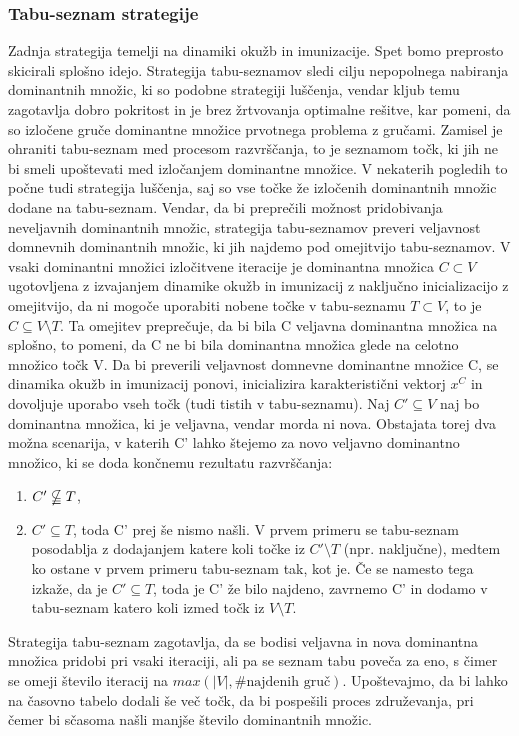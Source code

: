 \documentclass[a4paper]{article}
\begin{document}
\subsubsection{Tabu-seznam strategije} Zadnja strategija temelji na dinamiki okužb in imunizacije. Spet bomo preprosto skicirali splošno idejo. Strategija tabu-seznamov sledi cilju nepopolnega nabiranja dominantnih množic, ki so podobne strategiji luščenja, vendar kljub temu zagotavlja dobro pokritost in je brez žrtvovanja optimalne rešitve, kar pomeni, da so izločene gruče dominantne množice prvotnega problema z gručami. Zamisel je ohraniti tabu-seznam med procesom razvrščanja, to je seznamom točk, ki jih ne bi smeli upoštevati med izločanjem dominantne množice. V nekaterih pogledih to počne tudi strategija luščenja, saj so vse točke že izločenih dominantnih množic dodane na tabu-seznam. Vendar, da bi preprečili možnost pridobivanja neveljavnih dominantnih množic, strategija tabu-seznamov preveri veljavnost domnevnih dominantnih množic, ki jih najdemo pod omejitvijo tabu-seznamov. V vsaki dominantni množici izločitvene iteracije je dominantna množica $C \subset V$ ugotovljena z izvajanjem dinamike okužb in imunizacij z naključno inicializacijo z omejitvijo, da ni mogoče uporabiti nobene točke v tabu-seznamu $T \subset V$, to je $C \subseteq V\setminus T$. Ta omejitev preprečuje, da bi bila C veljavna dominantna množica na splošno, to pomeni, da C ne bi bila dominantna množica glede na celotno množico točk V. Da bi preverili veljavnost domnevne dominantne množice C, se dinamika okužb in imunizacij ponovi, inicializira karakteristični vektorj $x^C$ in dovoljuje uporabo vseh točk (tudi tistih v tabu-seznamu). Naj $C' \subseteq V$ naj bo dominantna množica, ki je veljavna, vendar morda ni nova. Obstajata torej dva možna scenarija, v katerih C' lahko štejemo za novo veljavno dominantno množico, ki se doda končnemu rezultatu razvrščanja:
\begin{enumerate}
\item $C' \nsubseteqq T$,
\item $C' \subseteq T$, toda C' prej še nismo našli. V prvem primeru se tabu-seznam posodablja z dodajanjem katere koli točke iz $C'\setminus T$ (npr. naključne), medtem ko ostane v prvem primeru tabu-seznam tak, kot je. Če se namesto tega izkaže, da je $C'\subseteq T$, toda je C' že bilo najdeno, zavrnemo C' in dodamo v tabu-seznam katero koli izmed točk iz $V\setminus T$.
\end{enumerate}
Strategija tabu-seznam zagotavlja, da se bodisi veljavna in nova dominantna množica pridobi pri vsaki iteraciji, ali pa se seznam tabu poveča za eno, s čimer se omeji število iteracij na $max(\lvert V \rvert, \text{\#najdenih gruč})$. Upoštevajmo, da bi lahko na časovno tabelo dodali še več točk, da bi pospešili proces združevanja, pri čemer bi sčasoma našli manjše število dominantnih množic.





\end{document}
